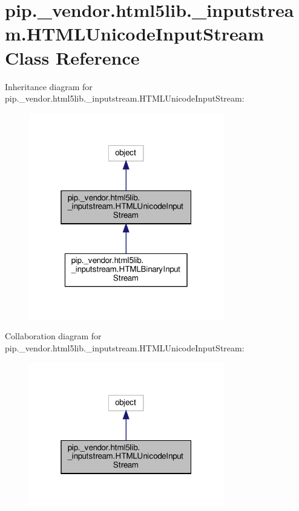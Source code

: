 \hypertarget{classpip_1_1__vendor_1_1html5lib_1_1__inputstream_1_1HTMLUnicodeInputStream}{}\section{pip.\+\_\+vendor.\+html5lib.\+\_\+inputstream.\+H\+T\+M\+L\+Unicode\+Input\+Stream Class Reference}
\label{classpip_1_1__vendor_1_1html5lib_1_1__inputstream_1_1HTMLUnicodeInputStream}


Inheritance diagram for pip.\+\_\+vendor.\+html5lib.\+\_\+inputstream.\+H\+T\+M\+L\+Unicode\+Input\+Stream\+:
\nopagebreak
\begin{figure}[H]
\begin{center}
\leavevmode
\includegraphics[width=241pt]{classpip_1_1__vendor_1_1html5lib_1_1__inputstream_1_1HTMLUnicodeInputStream__inherit__graph}
\end{center}
\end{figure}


Collaboration diagram for pip.\+\_\+vendor.\+html5lib.\+\_\+inputstream.\+H\+T\+M\+L\+Unicode\+Input\+Stream\+:
\nopagebreak
\begin{figure}[H]
\begin{center}
\leavevmode
\includegraphics[width=241pt]{classpip_1_1__vendor_1_1html5lib_1_1__inputstream_1_1HTMLUnicodeInputStream__coll__graph}
\end{center}
\end{figure}
